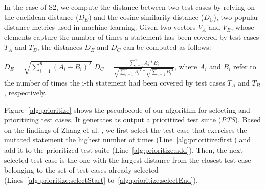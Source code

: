 In the case of S2, we compute the distance between two test cases by relying on the euclidean distance ($D_E$) and the cosine similarity distance ($D_C$), two popular distance metrics used in machine learning. 
Given two vectors $V_A$ and $V_B$, whose elements capture the number of times a statement has been covered by test cases $T_A$ and $T_B$, the distances $D_E$ and $D_C$ can be computed as follows:

$D_E=\sqrt{\sum_{i=1}^{n}(A_i-B_i)^2}$ 
$D_C= \frac{\sum_{i=1}^{n}A_i*B_i}{\sqrt{\sum_{i=1}^{n}{A_i}^2}*\sqrt{\sum_{i=1}^{n}{B_i}^2}}$,
where $A_i$ and $B_i$ refer to the number of times the i-th statement had been covered by test cases $T_A$ and $T_B$, respectively.

Figure~\ref{alg:prioritize} shows the pseudocode of our algorithm for selecting and prioritizing test cases. It generates as output
a prioritized test suite (\emph{PTS}).
Based on the findings of Zhang et al. \cite{zhang2013faster}, we first select the test case that exercises the mutated statement the highest number of times (Line~\ref{alg:prioritize:first})  { and add it to the prioritized test suite (Line~\ref{alg:prioritize:add}).}
Then, the next selected test case is the one with the largest distance from the closest test case belonging to the set of test cases already selected (Lines~\ref{alg:prioritize:selectStart} to~\ref{alg:prioritize:selectEnd}). 


